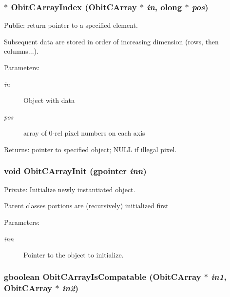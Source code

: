 \subsubsection{$\ast$ Obit\-CArray\-Index ({\bf Obit\-CArray} $\ast$ {\em in}, {\bf olong} $\ast$ {\em pos})}\label{ObitCArray_8c_a12}


Public: return pointer to a specified element. 

Subsequent data are stored in order of increasing dimension (rows, then columns...). \begin{Desc}
\item[Parameters:]
\begin{description}
\item[{\em in}]Object with data \item[{\em pos}]array of 0-rel pixel numbers on each axis \end{description}
\end{Desc}
\begin{Desc}
\item[Returns:]pointer to specified object; NULL if illegal pixel. \end{Desc}
\subsubsection{\setlength{\rightskip}{0pt plus 5cm}void Obit\-CArray\-Init (gpointer {\em inn})}\label{ObitCArray_8c_a3}


Private: Initialize newly instantiated object. 

Parent classes portions are (recursively) initialized first \begin{Desc}
\item[Parameters:]
\begin{description}
\item[{\em inn}]Pointer to the object to initialize. \end{description}
\end{Desc}
\subsubsection{\setlength{\rightskip}{0pt plus 5cm}gboolean Obit\-CArray\-Is\-Compatable ({\bf Obit\-CArray} $\ast$ {\em in1}, {\bf Obit\-CArray} $\ast$ {\em in2})}\label{ObitCArray_8c_a9}


